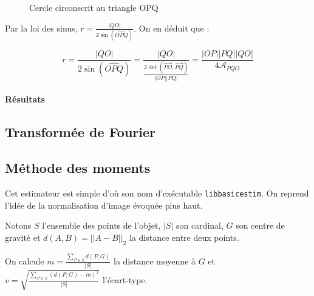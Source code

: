 \documentclass{article}
\theoremstyle{definition}
\begin{document}
	  \begin{figure}[!h]
	    \centering
	    \caption{Cercle circonscrit au triangle OPQ}
	    \label{cercle-circonscrit}
	  \end{figure}
	  
	  Par la loi des sinus, $r = \frac{|QO|}{2 \sin\left(\widehat{OPQ}\right)}$. On en déduit que :
	  
	  \[ r = \frac{|QO|}{2 \sin\left(\widehat{OPQ}\right)} = \frac{|QO|}{\frac{2 \det\left(\overrightarrow{PO}, \overrightarrow{PQ} \right)}{|OP| |PQ|}} = \frac{|OP| |PQ| |QO|}{4 \mathcal{A}_{PQO}}  \]
	
	\paragraph{Résultats}
    
    \subsection{Transformée de Fourier}  %
    
    \subsection{Méthode des moments} %
      Cet estimateur est simple d'où son nom d'exécutable \verb-libbasicestim-. On reprend l'idée de la normalisation d'image évoquée plus haut.
      
      Notons $S$ l'ensemble des points de l'objet, $|S|$ son cardinal, $G$ son centre de gravité et $d(A,B)=||A-B||_2$ la distance entre deux points.
      
      On calcule $m=\frac{\sum_{P\in S}d(P,G)}{|S|}$ la distance moyenne à $G$ et $v=\sqrt{\frac{\sum_{P\in S}\left ( d(P,G) -m\right ) ^2}{|S|}}$ l'écart-type.
      
\end{document}
